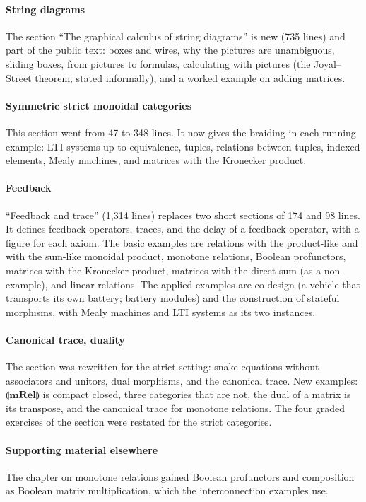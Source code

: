 \documentclass[11pt,a4paper]{article}
\newcommand{\tL}[1]{\llparenthesis\mathbf{#1}\rrparenthesis}   %
\begin{document}
\paragraph{String diagrams} The section ``The graphical calculus of string diagrams'' is new (735
lines) and part of the public text: boxes and wires, why the pictures are unambiguous, sliding
boxes, from pictures to formulas, calculating with pictures (the Joyal--Street theorem, stated
informally), and a worked example on adding matrices.

\paragraph{Symmetric strict monoidal categories} This section went from 47 to 348 lines. It now
gives the braiding in each running example: LTI systems up to equivalence, tuples, relations
between tuples, indexed elements, Mealy machines, and matrices with the Kronecker product.

\paragraph{Feedback} ``Feedback and trace'' (1{,}314 lines) replaces two short sections of 174 and
98 lines. It defines feedback operators, traces, and the delay of a feedback operator, with a
figure for each axiom. The basic examples are relations with the product-like and with the
sum-like monoidal product, monotone relations, Boolean profunctors, matrices with the Kronecker
product, matrices with the direct sum (as a non-example), and linear relations. The applied
examples are co-design (a vehicle that transports its own battery; battery modules) and the
construction of stateful morphisms, with Mealy machines and LTI systems as its two instances.

\paragraph{Canonical trace, duality} The section was rewritten for the strict setting: snake
equations without associators and unitors, dual morphisms, and the canonical trace. New examples:
$\tL{mRel}$ is compact closed, three categories that are not, the dual of a matrix is its
transpose, and the canonical trace for monotone relations. The four graded exercises of the
section were restated for the strict categories.

\paragraph{Supporting material elsewhere} The chapter on monotone relations gained Boolean
profunctors and composition as Boolean matrix multiplication, which the interconnection examples
use.
\end{document}
